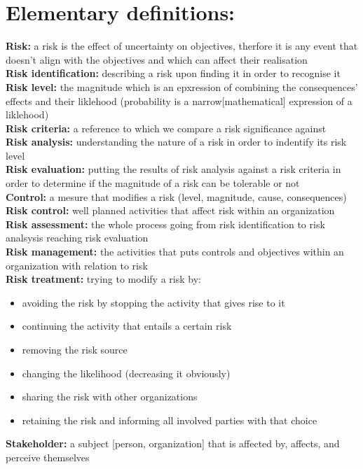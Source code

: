 \documentclass{article}
\begin{document}
\section{Elementary definitions:}
\noindent \textbf{Risk:} a risk is the effect of uncertainty on objectives, therfore
it is any event that doesn't align with the objectives and which can affect their realisation\\
\textbf{Risk identification:} describing a risk upon finding it in order to recognise it\\
\textbf{Risk level:} the magnitude which is an epxression of combining the consequences' effects
and their liklehood (probability is a narrow[mathematical] expression of a liklehood)\\
\textbf{Risk criteria:} a reference to which we compare a risk significance against\\
\textbf{Risk analysis:} understanding the nature of a risk in order to indentify its risk level\\
\textbf{Risk evaluation:} putting the results of risk analysis against a risk criteria in order
to determine if the magnitude of a risk can be tolerable or not\\
\textbf{Control:} a mesure that modifies a risk (level, magnitude, cause, consequences)
\textbf{Risk control:} well planned activities that affect risk within an organization\\
\textbf{Risk assessment:} the  whole process going from risk identification to risk analsysis reaching
risk evaluation\\
\textbf{Risk management:} the activities that puts controls and objectives within an organization with
relation to risk\\
\textbf{Risk treatment:} trying to modify a risk by:
\begin{itemize}
\item avoiding the risk by stopping the activity that gives rise to it
\item continuing the activity that entails a certain risk
\item removing the risk source
\item changing the likelihood (decreasing it obviously)
\item sharing the risk with other organizations
\item retaining the risk and informing all involved parties with that choice
\end{itemize}
\textbf{Stakeholder:} a subject [person, organization] that is affected by, affects, and perceive themselves
\end{document}
